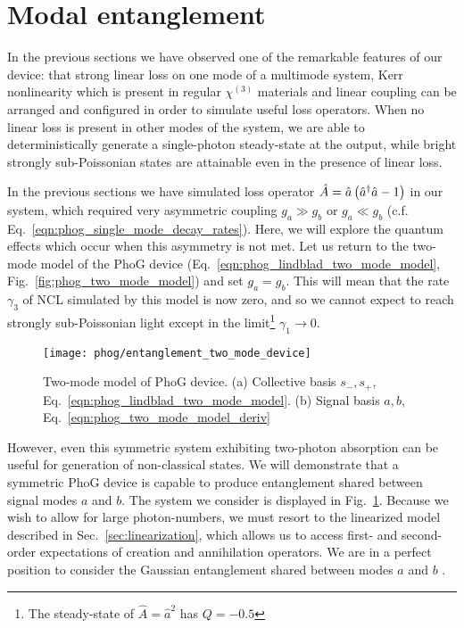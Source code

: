 \section{Modal entanglement}\label{sec:phog_entanglement}
In the previous sections we have observed one of the remarkable features of our device: that strong linear loss on one mode of a multimode system, Kerr nonlinearity which is present in regular $\chi^{\left(3\right)}$ materials and linear coupling can be arranged and configured in order to simulate useful loss operators. When no linear loss is present in other modes of the system, we are able to deterministically generate a single-photon steady-state at the output, while bright strongly sub-Poissonian states are attainable even in the presence of linear loss. 

In the previous sections we have simulated loss operator $\hat{A} = \hat{a}\left(\hat{a}^\dagger \hat{a} - 1\right)$ in our system, which required very asymmetric coupling $g_a \gg g_b$ or $g_a \ll g_b$ (c.f. Eq.~\ref{eqn:phog_single_mode_decay_rates}). Here, we will explore the quantum effects which occur when this asymmetry is not met. Let us return to the two-mode model of the PhoG device (Eq.~\ref{eqn:phog_lindblad_two_mode_model}, Fig.~\ref{fig:phog_two_mode_model}) and set $g_a = g_b$. This will mean that the rate $\gamma_3$ of NCL simulated by this model is now zero, and so we cannot expect to reach strongly sub-Poissonian light except in the limit\footnote{The steady-state of $\hat{A} = \hat{a}^2$ has $Q = -0.5$} $\gamma_1 \rightarrow 0$.

\begin{figure}[htp]
\centering
\texttt{[image: phog/entanglement\_two\_mode\_device]}
\caption{\label{fig:phog_entanglement_two_mode_device} Two-mode model of PhoG device. (a) Collective basis $s_-, s_+$, Eq.~\ref{eqn:phog_lindblad_two_mode_model}. (b) Signal basis $a, b$, Eq.~\ref{eqn:phog_two_mode_model_deriv}}
\end{figure}

However, even this symmetric system exhibiting two-photon absorption can be useful for generation of non-classical states. We will demonstrate that a symmetric PhoG device is capable to produce entanglement shared between signal modes $a$ and $b$. The system we consider is displayed in Fig.~\ref{fig:phog_entanglement_two_mode_device}. Because we wish to allow for large photon-numbers, we must resort to the linearized model described in Sec.~\ref{sec:linearization}, which allows us to access first- and second-order expectations of creation and annihilation operators. We are in a perfect position to consider the Gaussian entanglement shared between modes $a$ and $b$ \cite{Weedbrook2012, Adesso2007, Simon2000}.

